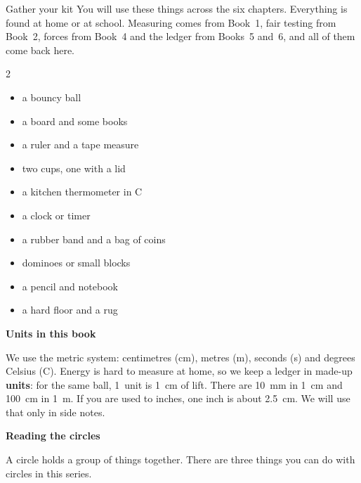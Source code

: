 \begin{tryit}{Gather your kit}
You will use these things across the six chapters. Everything is found at home or at school. Measuring comes from Book~1, fair testing from Book~2, forces from Book~4 and the ledger from Books~5 and~6, and all of them come back here.
\begin{multicols}{2}
\begin{itemize}[leftmargin=1.2em]
\item a bouncy ball
\item a board and some books
\item a ruler and a tape measure
\item two cups, one with a lid
\item a kitchen thermometer in \textdegree C
\item a clock or timer
\item a rubber band and a bag of coins
\item dominoes or small blocks
\item a pencil and notebook
\item a hard floor and a rug
\end{itemize}
\end{multicols}
\end{tryit}

{\sans\bfseries\large\color{sky!70!black} Units in this book}\par
We use the metric system: centimetres (cm), metres (m), seconds (s) and degrees Celsius (\textdegree C). Energy is hard to measure at home, so we keep a ledger in made-up \textbf{units}: for the same ball, 1~unit is 1~cm of lift.
There are 10~mm in 1~cm and 100~cm in 1~m. If you are used to inches, one inch is about 2.5~cm. We will use that only in side notes.
\clearpage

\thispagestyle{plain}\label{circlecard}
{\sans\bfseries\LARGE\color{ink} Reading the circles}\par\vspace{0.1cm}
A circle holds a group of things together. There are three things you can do with circles in this series.

